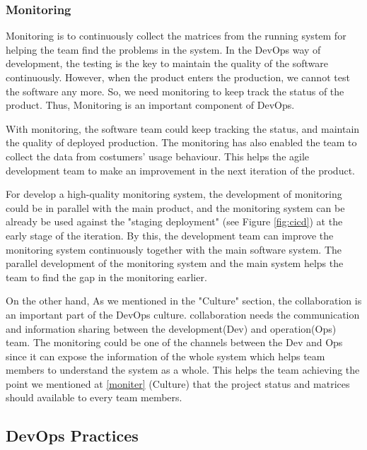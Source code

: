 \subsubsection[]{Monitoring}
Monitoring is to continuously collect the matrices from the running system for helping the team find the problems in the system.
In the DevOps way of development, the testing is the key to maintain the quality of the software continuously. However, when the product enters the production, we cannot test the software any more. So, we need monitoring to keep track the status of the product.\cite{huttermann2012devops} Thus, Monitoring is an important component of DevOps.
\par
With monitoring, the software team could keep tracking the status, and maintain the quality of deployed production. The monitoring has also enabled the team to collect the data from costumers' usage behaviour. This helps the agile development team to make an improvement in the next iteration of the product. \cite{lwakatare2015dimensions}
\par
For develop a high-quality monitoring system, the development of monitoring could be in parallel with the main product, and the monitoring system can be already be used against the "staging deployment" (see Figure \ref{fig:cicd}) at the early stage of the iteration. By this, the development team can improve the monitoring system continuously together with the main software system. The parallel development of the monitoring system and the main system helps the team to find the gap in the monitoring earlier.\cite{huttermann2012devops}
\par
On the other hand, As we mentioned in the "Culture" section, the collaboration is an important part of the DevOps culture. collaboration needs the communication and information sharing between the development(Dev) and operation(Ops) team. The monitoring could be one of the channels between the Dev and Ops since it can expose the information of the whole system which helps team members to understand the system as a whole. This helps the team achieving the point we mentioned at \ref{moniter} (Culture) that the project status and matrices should available to every team members.
\subsection{DevOps Practices}
